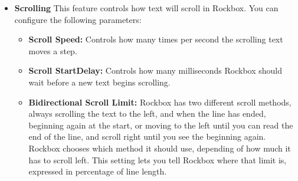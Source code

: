\begin{itemize}
\begin{itemize}
  \item \textbf{Scrolling}
    This feature controls how text will scroll in Rockbox. You can configure the following parameters:
    \begin{itemize}
    \item \textbf{Scroll Speed:} 
      Controls how many times per second the scrolling text moves a step.
    \item \textbf{Scroll StartDelay:} 
      Controls how many milliseconds Rockbox should wait before a new text begins scrolling.
    \item \textbf{Bidirectional Scroll Limit: }
      Rockbox has two different scroll methods,  always scrolling the text to the left, and when the line has ended, beginning again at the start, or moving to the left until you can read the end of the line, and scroll right until you see the beginning again. Rockbox chooses which method it should use, depending of how much it has to scroll left. This setting lets you tell Rockbox where that limit is, expressed in percentage of line length.
    \end{itemize}
    
    

\end{itemize}
\end{itemize}
